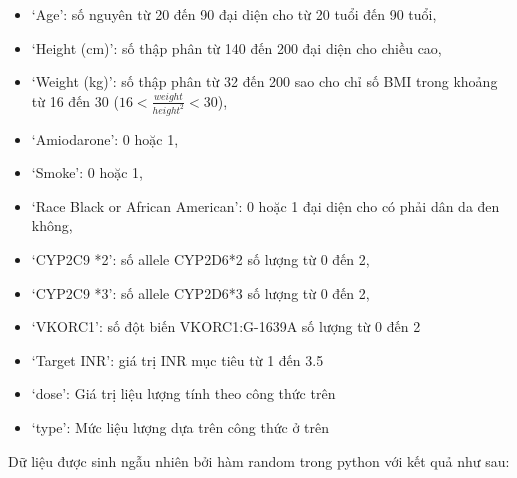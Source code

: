 \documentclass[14pt,oneside]{scrbook}
\providecommand{\tightlist}{\setlength{\itemsep}{\smallskipamount}\setlength{\parskip}{\smallskipamount}}
\begin{document}
\begin{itemize}
\tightlist
\item
  `Age': số nguyên từ 20 đến 90 đại diện cho từ 20 tuổi đến 90 tuổi,
\item
  `Height (cm)': số thập phân từ 140 đến 200 đại diện cho chiều cao,
\item
  `Weight (kg)': số thập phân từ 32 đến 200 sao cho chỉ số BMI trong
  khoảng từ 16 đến 30 (\(16 < \frac{weight}{height^2} < 30\)),
\item
  `Amiodarone': 0 hoặc 1,
\item
  `Smoke': 0 hoặc 1,
\item
  `Race Black or African American': 0 hoặc 1 đại diện cho có phải dân da
  đen không,
\item
  `CYP2C9 *2': số allele CYP2D6*2 số lượng từ 0 đến 2,
\item
  `CYP2C9 *3': số allele CYP2D6*3 số lượng từ 0 đến 2,
\item
  `VKORC1': số đột biến VKORC1:G-1639A số lượng từ 0 đến 2
\item
  `Target INR': giá trị INR mục tiêu từ 1 đến 3.5
\item
  `dose': Giá trị liệu lượng tính theo công thức trên
\item
  `type': Mức liệu lượng dựa trên công thức ở trên
\end{itemize}

Dữ liệu được sinh ngẫu nhiên bởi hàm random trong python với kết quả như
sau:
\end{document}
